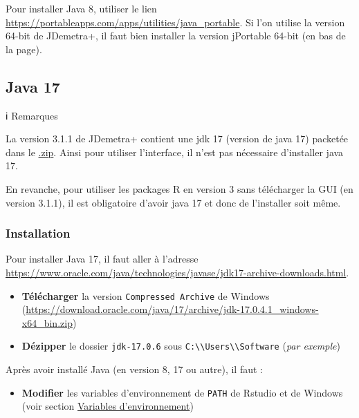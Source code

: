 \documentclass[
]{article}
\providecommand{\tightlist}{%
  \setlength{\itemsep}{0pt}\setlength{\parskip}{0pt}}
\begin{document}
Pour installer Java 8, utiliser le lien
\textcolor{html_color}{\url{https://portableapps.com/apps/utilities/java_portable}}.
Si l'on utilise la version 64-bit de JDemetra+, il faut bien installer
la version jPortable 64-bit (en bas de la page).

\hypertarget{java-17}{%
\subsection{Java 17}\label{java-17}}

ℹ️ Remarques

La version 3.1.1 de JDemetra+ contient une jdk 17 (version de java 17)
packetée dans le
\href{https://github.com/jdemetra/jdplus-main/releases/tag/v3.1.1}{.zip}.
Ainsi pour utiliser l'interface, il n'est pas nécessaire d'installer
java 17.

En revanche, pour utiliser les packages R en version 3 sans télécharger
la GUI (en version 3.1.1), il est obligatoire d'avoir java 17 et donc de
l'installer soit même.

\hypertarget{installation}{%
\subsubsection{Installation}\label{installation}}

Pour installer Java 17, il faut aller à l'adresse
\textcolor{html_color}{\url{https://www.oracle.com/java/technologies/javase/jdk17-archive-downloads.html}}.

\begin{itemize}
\tightlist
\item
  \textbf{Télécharger} la version \texttt{Compressed\ Archive} de
  Windows
  (\textcolor{html_color}{\url{https://download.oracle.com/java/17/archive/jdk-17.0.4.1_windows-x64_bin.zip}})
\item
  \textbf{Dézipper} le dossier
  \textcolor{windows_path_color}{\nolinkurl{jdk-17.0.6}} sous
  \textcolor{windows_path_color}{\nolinkurl{C:\\Users\\Software}}
  (\emph{par exemple})
\end{itemize}

Après avoir installé Java (en version 8, 17 ou autre), il faut :

\begin{itemize}
\tightlist
\item
  \textbf{Modifier} les variables d'environnement de \texttt{PATH} de
  Rstudio et de Windows (voir section
  \protect\hyperlink{var_env}{Variables d'environnement})
\end{itemize}
\end{document}
